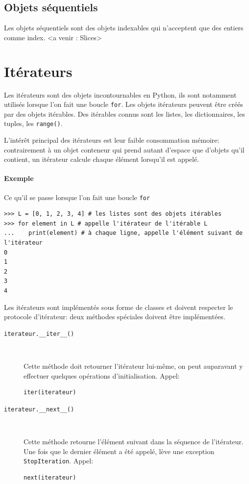 \documentclass[a4paper, 10pt]{article}
\begin{document}
\subsection{Objets séquentiels}

Les objets séquentiels sont des objets indexables qui n'acceptent que des entiers comme index. <a venir : Slices>


\section{Itérateurs}\label{iterateur}

Les itérateurs sont des objets incontournables en Python, ils sont notamment utilisés lorsque l'on fait une boucle \texttt{for}. Les objets itérateurs peuvent être créés par des objets itérables. Des itérables connus sont les listes, les dictionnaires, les tuples, les \texttt{range()}.\bigskip

L'intérêt principal des itérateurs est leur faible consommation mémoire: contrairement à un objet conteneur qui prend autant d'espace que d'objets qu'il contient, un itérateur calcule chaque élément lorsqu'il est appelé.

\paragraph{Exemple} Ce qu'il se passe lorsque l'on fait une boucle \texttt{for}
\begin{verbatim}
>>> L = [0, 1, 2, 3, 4] # les listes sont des objets itérables
>>> for element in L # appelle l'itérateur de l'itérable L
...    print(element) # à chaque ligne, appelle l'élément suivant de l'itérateur
0
1
2
3
4
\end{verbatim}

Les itérateurs sont implémentés sous forme de classes et doivent respecter le protocole d'itérateur: deux méthodes spéciales doivent être implémentées.
\begin{description}
    \item[\texttt{iterateur.__iter__()}]~

    Cette méthode doit retourner l'itérateur lui-même, on peut auparavant y effectuer quelques opérations d’initialisation. Appel:
    \begin{verbatim}
iter(iterateur)
    \end{verbatim}

    \item[\texttt{iterateur.__next__()}]~

    Cette méthode retourne l'élément suivant dans la séquence de l'itérateur. Une fois que le dernier élément a été appelé, lève une exception \texttt{StopIteration}. Appel:
    \begin{verbatim}
next(iterateur)
    \end{verbatim}
\end{description}
\end{document}
